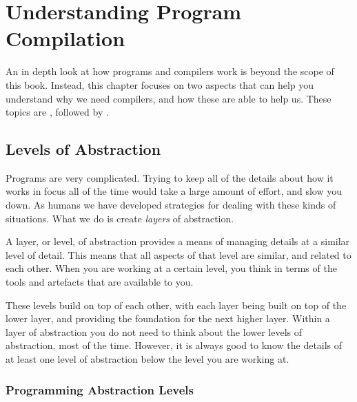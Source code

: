 






\clearpage
\def\pageLang{}
\section{Understanding Program Compilation} %
\label{sec:understanding_program_compilation}

An in depth look at how programs and compilers work is beyond the scope of this book. Instead, this chapter focuses on two aspects that can help you understand why we need compilers, and how these are able to help us. These topics are , followed by .

\subsection{Levels of Abstraction} %
\label{sub:levels_of_abstraction}

Programs are very complicated. Trying to keep all of the details about how it works in focus all of the time would take a large amount of effort, and slow you down. As humans we have developed strategies for dealing with these kinds of situations. What we do is create \emph{layers} of abstraction.

A layer, or level, of abstraction provides a means of managing details at a similar level of detail. This means that all aspects of that level are similar, and related to each other. When you are working at a certain level, you think in terms of the tools and artefacts that are available to you. 

These levels build on top of each other, with each layer being built on top of the lower layer, and providing the foundation for the next higher layer. Within a layer of abstraction you do not need to think about the lower levels of abstraction, most of the time. However, it is always good to know the details of at least one level of abstraction below the level you are working at.

\subsubsection{Programming Abstraction Levels} %
\label{ssub:programming_abstraction_levels}

